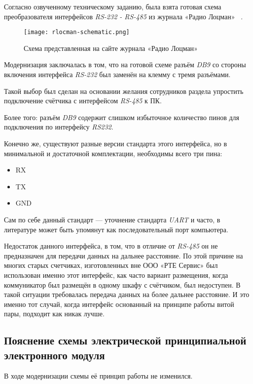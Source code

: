 Согласно озвученному техническому заданию,
была взята готовая схема преобразователя интерфейсов
\textit{RS-232 - RS-485} из
журнала «Радио Лоцман» ~\cite{rlocman-rs-converter}.

\begin{figure}[H]
  \centering
  \texttt{[image: rlocman-schematic.png]}
  \caption{Схема представленная на сайте журнала «Радио Лоцман»}
\end{figure}

Модернизация заключалась в том,
что на готовой схеме разъём \textit{DB9}
со стороны включения интерфейса \textit{RS-232}
был заменён на клемму с тремя разъёмами.

Такой выбор был сделан на основании
желания сотрудников раздела
упростить подключение счётчика с интерфейсом \textit{RS-485} к ПК.

Более того: разъём \textit{DB9}
содержит слишком избыточное количество
пинов для подключения по интерфейсу \textit{RS232}.

Конечно же, существуют разные версии стандарта этого интерфейса,
но в минимальной и достаточной комплектации,
необходимы всего три пина:
\begin{itemize}
\item RX
\item TX
\item GND
\end{itemize}

Сам по себе данный стандарт — уточнение
стандарта \textit{UART} и часто, в литературе может быть упомянут как
последовательный порт компьютера.

Недостаток данного интерфейса, в том,
что в отличие от \textit{RS-485}
он не предназначен для передачи данных на дальнее расстояние.
По этой причине на многих старых счетчиках,
изготовленных вне ООО «РТЕ Сервис» был
использован именно этот интерфейс,
как часто вариант размещения,
когда коммуникатор был размещён в одному шкафу с счётчиком,
был недоступен.
В такой ситуации требовалась передача данных на более дальнее расстояние.
И это именно тот случай, когда интерфейс
основанный на принципе работы витой пары,
подходит как никак лучше.


\subsection{Пояснение схемы электрической принципиальной\\
  электронного модуля}

В ходе модернизации схемы её принцип работы не изменился.

